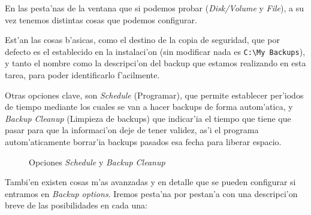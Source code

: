 \documentclass[11pt]{article}
\begin{document}
		En las pesta'nas de la ventana que si podemos probar (\textit{Disk/Volume} y \textit{File}), a su vez tenemos distintas cosas que podemos configurar. 
		
		Est'an las cosas b'asicas, como el destino de la copia de seguridad, que por defecto es el establecido en la instalaci'on (sin modificar nada es \texttt{C:\textbackslash{}My Backups}), y tanto el nombre como la descripci'on del backup que estamos realizando en esta tarea, para poder identificarlo f'acilmente.
		
		Otras opciones clave, son \textit{Schedule} (Programar), que permite establecer per'iodos de tiempo mediante los cuales se van a hacer backups de forma autom'atica, y \textit{Backup Cleanup} (Limpieza de backups) que indicar'ia el tiempo que tiene que pasar para que la informaci'on deje de tener validez, as'i el programa autom'aticamente borrar'ia backups pasados esa fecha para liberar espacio.
		
		
		\begin{figure}
			\centering
			\hfill
			\vspace{7pt}
			\caption{Opciones \textit{Schedule} y \textit{Backup Cleanup}}
		\end{figure}
	
		Tambi'en existen cosas m'as avanzadas y en detalle que se pueden configurar si entramos en \textit{Backup options}. Iremos pesta'na por pestan'a con una descripci'on breve de las posibilidades en cada una:
		
\end{document}
